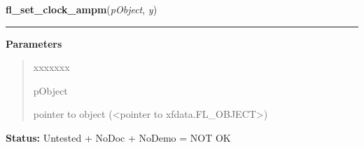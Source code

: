 \hspace{.8\funcindent}\begin{boxedminipage}{\funcwidth}

    \raggedright \textbf{fl\_set\_clock\_ampm}(\textit{pObject}, \textit{y})

    \vspace{-1.5ex}

    \rule{\textwidth}{0.5\fboxrule}
\setlength{\parskip}{2ex}
\setlength{\parskip}{1ex}
      \textbf{Parameters}
      \vspace{-1ex}

      \begin{quote}
        \begin{Ventry}{xxxxxxx}

          \item[pObject]

          pointer to object ({\textless}pointer to 
          xfdata.FL\_OBJECT{\textgreater})

        \end{Ventry}

      \end{quote}

\textbf{Status:} Untested + NoDoc + NoDemo = NOT OK



    \end{boxedminipage}

    \label{xformslib:library:fl_add_counter}

    \vspace{0.5ex}

